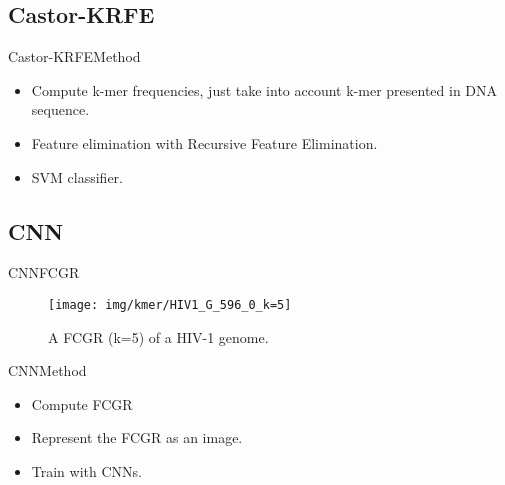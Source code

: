 \documentclass[10pt]{beamer}
\newcommand{\1}{
        	\setbeamertemplate{background}{
        		\texttt{[image: img/1]}
        		\tikz[overlay] \fill[fill opacity=0.75,fill=white] (0,0) rectangle (-\paperwidth,\paperheight);
        	}
}
\begin{document}
\subsection{Castor-KRFE}

\begin{frame}{Castor-KRFE}{Method}
	\begin{block}{}
		\begin{itemize}
			\item Compute k-mer frequencies, just take into account k-mer presented in DNA sequence.
			\item Feature elimination with Recursive Feature Elimination.
			\item SVM classifier.
		\end{itemize}
	\end{block}
\end{frame}

\subsection{CNN}

\begin{frame}{CNN}{FCGR}
		\begin{figure}[h]
		\centering
		\texttt{[image: img/kmer/HIV1\_G\_596\_0\_k=5]}
		\caption{A FCGR (k=5) of a HIV-1 genome.}
		\label{fig:cgr_img}
	\end{figure}
\end{frame}

\begin{frame}{CNN}{Method}
	\begin{block}{}
		\begin{itemize}
			\item Compute FCGR 
			\item Represent the FCGR as an image.
			\item Train with CNNs.
		\end{itemize}
	\end{block}
\end{frame}
\end{document}
